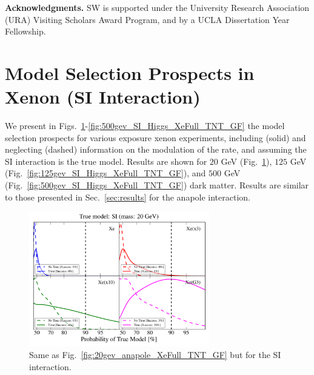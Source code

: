 \documentclass[11pt]{article}
\newcommand{\Sec}[1]{Sec.~\ref{#1}} \newcommand{\Secs}[2]{Secs.~\ref{#1} and \ref{#2}} \newcommand{\Secm}[2]{Secs.~\ref{#1} through \ref{#2}}
\newcommand{\Fig}[1]{Fig.~\ref{#1}} \newcommand{\Figs}[2]{Figs.~\ref{#1} and \ref{#2}}
\begin{document}
\bigskip

\textbf{Acknowledgments.} SW is supported under the University Research Association (URA) Visiting Scholars Award Program, and by a UCLA Dissertation Year Fellowship. %

\appendix

\section{Model Selection Prospects in Xenon (SI Interaction)}
We present in Figs.~\ref{fig:20gev_SI_Higgs_XeFull_TNT_GF}-\ref{fig:500gev_SI_Higgs_XeFull_TNT_GF} the model selection prospects for various exposure xenon experiments, including (solid) and neglecting (dashed) information on the modulation of the rate, and assuming the SI interaction is the true model. Results are shown for $20$ GeV (\Fig{fig:20gev_SI_Higgs_XeFull_TNT_GF}), $125$ GeV (\Fig{fig:125gev_SI_Higgs_XeFull_TNT_GF}), and $500$ GeV (\Fig{fig:500gev_SI_Higgs_XeFull_TNT_GF}) dark matter. Results are similar to those presented in \Sec{sec:results} for the anapole interaction. 


\begin{figure}
\centering
\includegraphics[width=0.7\textwidth]{plots/PDF_20GeV_SI_Higgs_50sims_Xe_Xe3x_Xe10x_XeG3_GF_TNT.pdf}
\caption{\label{fig:20gev_SI_Higgs_XeFull_TNT_GF}
Same as Fig.~\ref{fig:20gev_anapole_XeFull_TNT_GF} but for the SI interaction.}
\end{figure}
\end{document}
